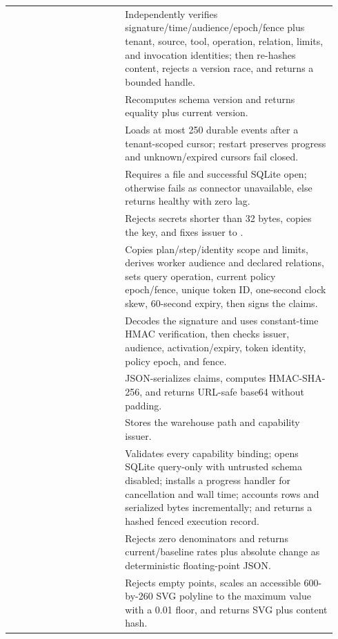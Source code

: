 \begin{longtable}{L{0.33\linewidth}L{0.61\linewidth}}
 & Independently verifies signature/time/audience/epoch/fence plus tenant, source, tool, operation, relation, limits, and invocation identities; then re-hashes content, rejects a version race, and returns a bounded handle. \\
 & Recomputes schema version and returns equality plus current version. \\
 & Loads at most 250 durable events after a tenant-scoped cursor; restart preserves progress and unknown/expired cursors fail closed. \\
 & Requires a file and successful SQLite open; otherwise fails as connector unavailable, else returns healthy with zero lag. \\
 & Rejects secrets shorter than 32 bytes, copies the key, and fixes issuer to . \\
 & Copies plan/step/identity scope and limits, derives worker audience and declared relations, sets query operation, current policy epoch/fence, unique token ID, one-second clock skew, 60-second expiry, then signs the claims. \\
 & Decodes the signature and uses constant-time HMAC verification, then checks issuer, audience, activation/expiry, token identity, policy epoch, and fence. \\
 & JSON-serializes claims, computes HMAC-SHA-256, and returns URL-safe base64 without padding. \\
 & Stores the warehouse path and capability issuer. \\
 & Validates every capability binding; opens SQLite query-only with untrusted schema disabled; installs a progress handler for cancellation and wall time; accounts rows and serialized bytes incrementally; and returns a hashed fenced execution record. \\
 & Rejects zero denominators and returns current/baseline rates plus absolute change as deterministic floating-point JSON. \\
 & Rejects empty points, scales an accessible 600-by-260 SVG polyline to the maximum value with a 0.01 floor, and returns SVG plus content hash. \\

\end{longtable}
